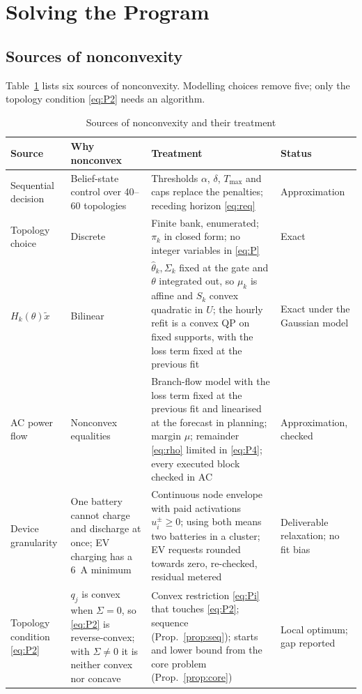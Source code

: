 \documentclass[journal,onecolumn,11pt]{IEEEtran}
\begin{document}
\section{Solving the Program}\label{sec:nonconvex}

\subsection{Sources of nonconvexity}
Table~\ref{tab:nonconvex} lists six sources of nonconvexity. Modelling choices remove five; only the topology condition \eqref{eq:P2} needs an algorithm.

\begin{table}[!htbp]
\centering
\caption{Sources of nonconvexity and their treatment}\label{tab:nonconvex}
\small
\begin{tabular}{>{\raggedright\arraybackslash}p{2.5cm}>{\raggedright\arraybackslash}p{3.3cm}>{\raggedright\arraybackslash}p{6.0cm}>{\raggedright\arraybackslash}p{2.5cm}}
\toprule
Source & Why nonconvex & Treatment & Status\\
\midrule
Sequential decision & Belief-state control over 40--60 topologies & Thresholds $\alpha$, $\delta$, $T_{\max}$ and caps replace the penalties; receding horizon \eqref{eq:req} & Approximation\\
Topology choice & Discrete & Finite bank, enumerated; $\pi_k$ in closed form; no integer variables in \eqref{eq:P} & Exact\\
$H_k(\theta)\tilde x$ & Bilinear & $\hat\theta_k,\Sigma_k$ fixed at the gate and $\theta$ integrated out, so $\mu_k$ is affine and $S_k$ convex quadratic in $U$; the hourly refit is a convex QP on fixed supports, with the loss term fixed at the previous fit & Exact under the Gaussian model\\
AC power flow & Nonconvex equalities & Branch-flow model with the loss term fixed at the previous fit and linearised at the forecast in planning; margin $\mu$; remainder \eqref{eq:rho} limited in \eqref{eq:P4}; every executed block checked in AC & Approximation, checked\\
Device granularity & One battery cannot charge and discharge at once; EV charging has a 6~A minimum & Continuous node envelope with paid activations $u_i^\pm\ge0$; using both means two batteries in a cluster; EV requests rounded towards zero, re-checked, residual metered & Deliverable relaxation; no fit bias\\
Topology condition \eqref{eq:P2} & $q_j$ is convex when $\Sigma=0$, so \eqref{eq:P2} is reverse-convex; with $\Sigma\ne0$ it is neither convex nor concave & Convex restriction \eqref{eq:Pi} that touches \eqref{eq:P2}; sequence (Prop.~\ref{prop:seq}); starts and lower bound from the core problem (Prop.~\ref{prop:core}) & Local optimum; gap reported\\
\bottomrule
\end{tabular}
\end{table}
\end{document}
